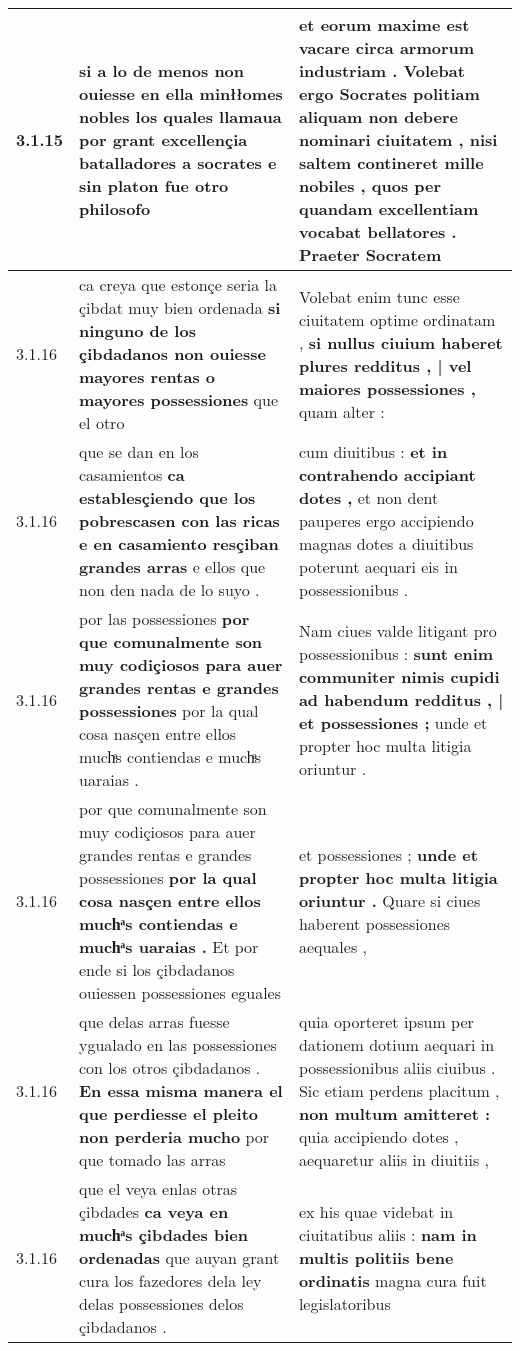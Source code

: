 \begin{tabular}{|p{1cm}|p{6.5cm}|p{6.5cm}|}
3.1.15 & si a lo de menos non ouiesse en ella minłłomes nobles los quales llamaua \textbf{ por grant excellençia batalladores } a socrates e sin platon fue otro philosofo & et eorum maxime est vacare circa armorum industriam . Volebat ergo Socrates politiam aliquam non debere nominari ciuitatem , nisi saltem contineret mille nobiles , \textbf{ quos per quandam excellentiam vocabat bellatores . } Praeter Socratem \\\hline
3.1.16 & ca creya que estonçe seria la çibdat muy bien ordenada \textbf{ si ninguno de los çibdadanos non ouiesse mayores rentas o mayores possessiones } que el otro & Volebat enim tunc esse ciuitatem optime ordinatam , \textbf{ si nullus ciuium haberet plures redditus , | vel maiores possessiones , } quam alter : \\\hline
3.1.16 & que se dan en los casamientos \textbf{ ca establesçiendo que los pobrescasen con las ricas e en casamiento resçiban grandes arras } e ellos que non den nada de lo suyo . & cum diuitibus : \textbf{ et in contrahendo accipiant dotes , } et non dent pauperes ergo accipiendo magnas dotes a diuitibus poterunt aequari eis in possessionibus . \\\hline
3.1.16 & por las possessiones \textbf{ por que comunalmente son muy codiçiosos para auer grandes rentas e grandes possessiones } por la qual cosa nasçen entre ellos muchͣs contiendas e muchͣs uaraias . & Nam ciues valde litigant pro possessionibus : \textbf{ sunt enim communiter nimis cupidi ad habendum redditus , | et possessiones ; } unde et propter hoc multa litigia oriuntur . \\\hline
3.1.16 & por que comunalmente son muy codiçiosos para auer grandes rentas e grandes possessiones \textbf{ por la qual cosa nasçen entre ellos muchͣs contiendas e muchͣs uaraias . } Et por ende si los çibdadanos ouiessen possessiones eguales & et possessiones ; \textbf{ unde et propter hoc multa litigia oriuntur . } Quare si ciues haberent possessiones aequales , \\\hline
3.1.16 & que delas arras fuesse ygualado en las possessiones con los otros çibdadanos . \textbf{ En essa misma manera el que perdiesse el pleito non perderia mucho } por que tomado las arras & quia oporteret ipsum per dationem dotium aequari in possessionibus aliis ciuibus . Sic etiam perdens placitum , \textbf{ non multum amitteret : } quia accipiendo dotes , aequaretur aliis in diuitiis , \\\hline
3.1.16 & que el veya enlas otras çibdades \textbf{ ca veya en muchͣs çibdades bien ordenadas } que auyan grant cura los fazedores dela ley delas possessiones delos çibdadanos . & ex his quae videbat in ciuitatibus aliis : \textbf{ nam in multis politiis bene ordinatis } magna cura fuit legislatoribus \\\hline

\end{tabular}
